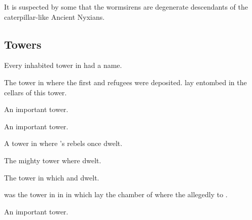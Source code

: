 It is suspected by some that the wormsirens are degenerate descendants of the caterpillar-like Ancient Nyxians. 










\subsection{Towers}
Every inhabited tower in \Nyx had a name. 





\begin{gloss}



  \gitem{\Jazerubel}
  The tower in  where the first \resphan and \nephil refugees were deposited.
  \Semiza lay entombed in the cellars of this tower. 



  \gitem{\Lamaruch}
  An important \Mystraacht tower.



  \gitem{\Roshmal}
  An important \Mystraacht tower.



  \gitem{\Sherem}
  A tower in \Merkyrah where 's rebels once dwelt.



  \gitem{\Shaiphon}
  The mighty tower where  dwelt.



  \gitem{\Tebethal}
  The tower in which  and  dwelt. 



  \gitem{\Tirunad}
  \Tirunad was the tower in  in  in which lay the chamber of  where the  allegedly  to .



  \gitem{\Tzarubal}
  An important \Mystraacht tower.



\end{gloss}









